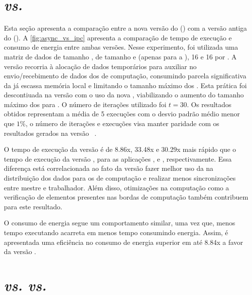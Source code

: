 \section{\mppa \async \textit{vs.} \mppa \ipc}
\label{sec:async_vs_ipc}

Esta seção apresenta a comparação entre a nova versão do \pskelmppa (\async) com a versão antiga do \pskelmppa (\ipc). 
A \autoref{fig:async_vs_ipc} apresenta a comparação de tempo de execução e consumo de energia entre ambas versões.
Nesse experimento, foi utilizada uma matriz de dados de tamanho \ind, \tiles de tamanho \tilec e \tiled (apenas para a \async), 16 \clusters e 16 \pes por \cluster.
A versão \ipc recorria à alocação de dados temporários para auxiliar no envio/recebimento de dados dos \clusters de computação, consumindo parcela significativa da já escassa memória local e limitando o tamanho máximo dos \tiles.
Esta prática foi descontiuada na versão \async com o uso da nova \api, viabilizando o aumento do tamanho máximo dos \tiles para \tiled.
O número de iterações utilizado foi $t = 30$. Os resultados obtidos representam a média de 5 execuções com o desvio padrão médio menor que $1\%$, o número de iterações e execuções visa manter paridade com os resultados gerados na versão \ipc~\cite{Podesta:TCC}. 



O tempo de execução da versão \async é de 8.86x, 33.48x e 30.29x mais rápido que o tempo de execução da versão   \ipc, para as aplicações \fur, \gol e \jacobi, respectivamente. Essa diferença está correlacionada ao fato da versão \async fazer melhor uso da \noc na distribuição dos dados para os \cluster de computação e realizar menos sincronizações entre mestre e trabalhador. Além disso, otimizações na computação como a verificação de elementos presentes nas bordas de computação também contribuem para este resultado.

O consumo de energia segue um comportamento similar, uma vez que, menos tempo executando acarreta em menos tempo consumindo energia. Assim, é apresentada uma eficiência no consumo de energia superior em até 8.84x a favor da versão \async.



\section{\mppa \async \textit{vs.} \cpu \textit{vs.} \gpu}
\label{sec:async_vs_cpu_gpu}

